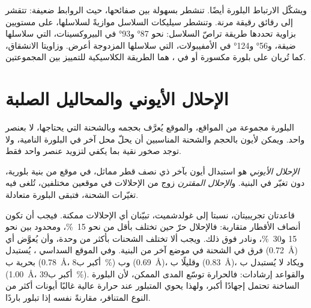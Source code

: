 ويشكّل الارتباط البلورة أيضًا.  تنشطر بسهولة بين صفائحها، حيث الروابط ضعيفة:  تتقشر إلى رقائق رقيقة مرنة. وتنشطر سيليكات السلاسل موازيةً لسلاسلها، على مستويين بزاوية تحددها طريقة تراصّ السلاسل: نحو \ang{87} و\ang{93} في البيروكسينات، التي سلاسلها ضيقة، و\ang{56} و\ang{124} في الأمفيبولات، التي سلاسلها المزدوجة أعرض. وزاويتا الانشقاق، كما تُريان على بلورة مكسورة أو في ، هما الطريقة الكلاسيكية للتمييز بين المجموعتين.

\section{الإحلال الأيوني والمحاليل الصلبة}

البلورة مجموعة من المواقع، والموقع يُعرَّف بحجمه وبالشحنة التي يحتاجها، لا بعنصر واحد. ويمكن لأيون بالحجم والشحنة المناسبين أن يحلّ محل آخر في البلورة النامية، ولا توجد صخور نقية بما يكفي لتزويد عنصر واحد فقط.

\begin{definition}\label{def:b1:rock-forming-minerals:substitution}
\emph{الإحلال الأيوني} هو استبدال أيون بآخر ذي نصف قطر مماثل، في موقع من بنية بلورية، دون تغيّر في البنية. و\emph{الإحلال المقترن} زوج من الإحلالات في موقعين مختلفين، تُلغى فيه تغيّرات الشحنة، فتبقى البلورة متعادلة.
\end{definition}

قاعدتان تجريبيتان، نسبتا إلى غولدشميت، تبيّنان أي الإحلالات ممكنة. فيجب أن تكون أنصاف الأقطار متقاربة: فالإحلال حرّ حين تختلف بأقل من نحو \qty{15}{\percent}، ومحدود بين نحو 15 و\qty{30}{\percent}، ونادر فوق ذلك. ويجب ألا تختلف الشحنات بأكثر من وحدة، وأن يُعوَّض أي فرق في الشحنة في موضع آخر من البنية. وفي الموقع السداسي ، يُستبدل  (\qty{0.72}{\angstrom}) بحرية ب (\qty{0.78}{\angstrom}، أكبر ب\qty{8}{\percent}) وب (\qty{0.69}{\angstrom})، وقليلًا ب (\qty{0.83}{\angstrom})، ويكاد لا يُستبدل ب (\qty{1.00}{\angstrom}، أكبر ب\qty{39}{\percent}). والقواعد إرشادات: فالحرارة توسّع المدى الممكن، لأن البلورة الساخنة تحتمل إجهادًا أكبر، ولهذا يحوي  المتبلور عند حرارة عالية غالبًا أيونات أكثر من النوع المتنافر، مقارنةً  نفسه إذا تبلور باردًا.

